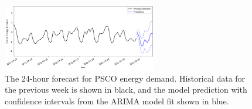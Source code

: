 \documentclass[12pt]{article}
\begin{document}
\begin{figure}[h]
    \centering
    \includegraphics[width=0.6\textwidth]{figures/forecast.png}
    \caption{The 24-hour forecast for PSCO energy demand. Historical data for the previous week is shown in black, and the model prediction with confidence intervals from the ARIMA model fit shown in blue.}
    \label{fig:forecast}
\end{figure}

\clearpage
\pagebreak
\end{document}
